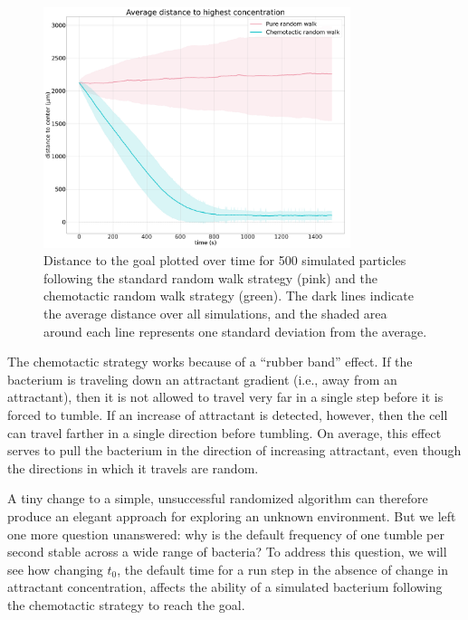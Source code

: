 \begin{figure}[h]
\centering
\mySfFamily
\includegraphics[width = 0.8\textwidth]{../images/chemotaxis_performance_compare_uniform.png}
\caption{Distance to the goal plotted over time for 500 simulated particles following the standard random walk strategy (pink) and the chemotactic random walk strategy (green). The dark lines indicate the average distance over all simulations, and the shaded area around each line represents one standard deviation from the average.}
\label{fig:chemotaxis_performance_compare_uniform}
\end{figure}

The chemotactic strategy works because of a ``rubber band'' effect. If the bacterium is traveling down an attractant gradient (i.e., away from an attractant), then it is not allowed to travel very far in a single step before it is forced to tumble. If an increase of attractant is detected, however, then the cell can travel farther in a single direction before tumbling. On average, this effect serves to pull the bacterium in the direction of increasing attractant, even though the directions in which it travels are random.

A tiny change to a simple, unsuccessful randomized algorithm can therefore produce an elegant approach for exploring an unknown environment. But we left one more question unanswered: why is the default frequency of one tumble per second stable across a wide range of bacteria? To address this question, we will see how changing $t_0$, the default time for a run step in the absence of change in attractant concentration, affects the ability of a simulated bacterium following the chemotactic strategy to reach the goal.

